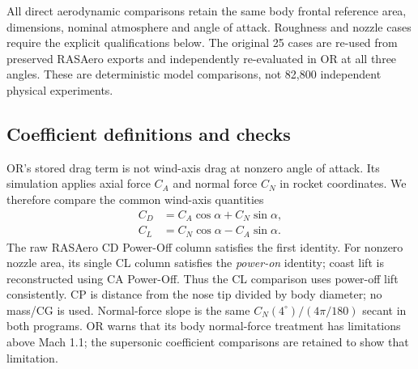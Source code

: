 \documentclass[oneside,openany]{amsdtx}
\begin{document}
All direct aerodynamic comparisons retain the same body frontal reference area, dimensions, nominal atmosphere and angle of attack. Roughness and nozzle cases require the explicit qualifications below. The original 25 cases are re-used from preserved RASAero exports and independently re-evaluated in OR at all three angles. These are deterministic model comparisons, not 82,800 independent physical experiments.

\subsection{Coefficient definitions and checks}
OR's stored drag term is not wind-axis drag at nonzero angle of attack. Its simulation applies axial force $C_A$ and normal force $C_N$ in rocket coordinates. We therefore compare the common wind-axis quantities
\begin{align}
 C_D&=C_A\cos\alpha+C_N\sin\alpha,\\
 C_L&=C_N\cos\alpha-C_A\sin\alpha.
\end{align}
The raw RASAero CD Power-Off column satisfies the first identity. For nonzero nozzle area, its single CL column satisfies the \emph{power-on} identity; coast lift is reconstructed using CA Power-Off. Thus the CL comparison uses power-off lift consistently. CP is distance from the nose tip divided by body diameter; no mass/CG is used. Normal-force slope is the same $C_N(4^\circ)/(4\pi/180)$ secant in both programs. OR warns that its body normal-force treatment has limitations above Mach 1.1; the supersonic coefficient comparisons are retained to show that limitation.
\end{document}
